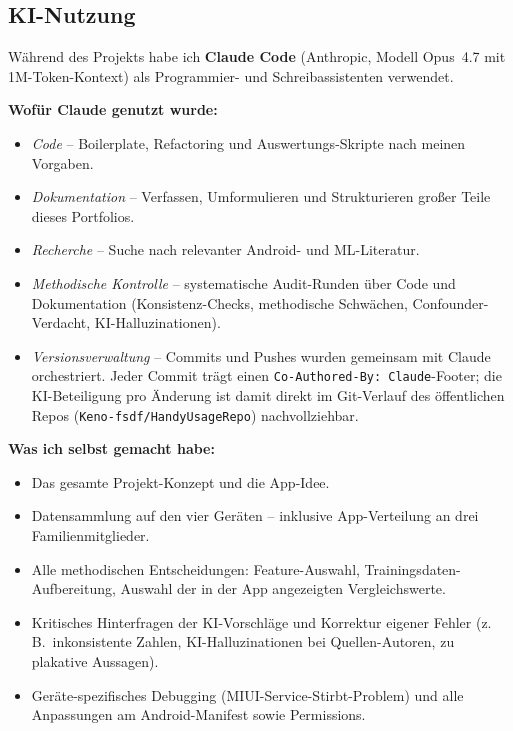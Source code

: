 \documentclass[12pt, a4paper, ngerman]{article}
\newcommand{\code}[1]{\texttt{#1}}
\begin{document}
\newpage

\subsection{KI-Nutzung}

Während des Projekts habe ich \textbf{Claude Code} (Anthropic, Modell
Opus~4.7 mit 1M-Token-Kontext) als Programmier- und Schreibassistenten
verwendet.

\textbf{Wofür Claude genutzt wurde:}

\begin{itemize}
\item \emph{Code} -- Boilerplate, Refactoring und
  Auswertungs-Skripte nach meinen Vorgaben.
\item \emph{Dokumentation} -- Verfassen, Umformulieren und
  Strukturieren großer Teile dieses Portfolios.
\item \emph{Recherche} -- Suche nach relevanter Android- und
  ML-Literatur.
\item \emph{Methodische Kontrolle} -- systematische Audit-Runden
  über Code und Dokumentation (Konsistenz-Checks, methodische
  Schwächen, Confounder-Verdacht, KI-Halluzinationen).
\item \emph{Versionsverwaltung} -- Commits und Pushes wurden
  gemeinsam mit Claude orchestriert. Jeder Commit trägt einen
  \code{Co-Authored-By: Claude}-Footer; die KI-Beteiligung pro
  Änderung ist damit direkt im Git-Verlauf des öffentlichen Repos
  (\code{Keno-fsdf/HandyUsageRepo}) nachvollziehbar.
\end{itemize}

\textbf{Was ich selbst gemacht habe:}

\begin{itemize}
\item Das gesamte Projekt-Konzept und die App-Idee.
\item Datensammlung auf den vier Geräten -- inklusive
  App-Verteilung an drei Familienmitglieder.
\item Alle methodischen Entscheidungen: Feature-Auswahl,
  Trainingsdaten-Aufbereitung, Auswahl der in der App angezeigten
  Vergleichswerte.
\item Kritisches Hinterfragen der KI-Vorschläge und Korrektur
  eigener Fehler (z.\,B.\ inkonsistente Zahlen, KI-Halluzinationen
  bei Quellen-Autoren, zu plakative Aussagen).
\item Geräte-spezifisches Debugging (MIUI-Service-Stirbt-Problem)
  und alle Anpassungen am Android-Manifest sowie Permissions.
\end{itemize}
\end{document}
